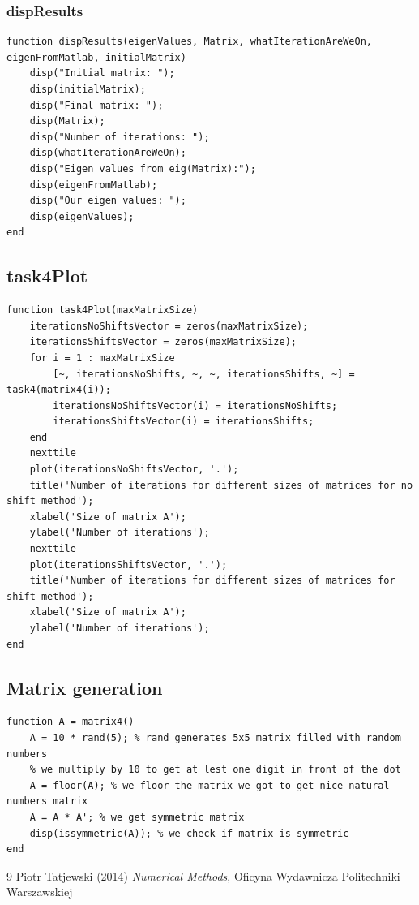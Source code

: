 \subsubsection{dispResults}
\begin{simplechar}
\begin{lstlisting}
function dispResults(eigenValues, Matrix, whatIterationAreWeOn, eigenFromMatlab, initialMatrix)
    disp("Initial matrix: ");
    disp(initialMatrix);
    disp("Final matrix: ");
    disp(Matrix);
    disp("Number of iterations: ");
    disp(whatIterationAreWeOn);
    disp("Eigen values from eig(Matrix):");
    disp(eigenFromMatlab);
    disp("Our eigen values: ");
    disp(eigenValues);
end
\end{lstlisting}
\end{simplechar}

\newpage
\hypertarget{function4}{\subsection{task4Plot}}
\begin{simplechar}
\begin{lstlisting}
function task4Plot(maxMatrixSize)
    iterationsNoShiftsVector = zeros(maxMatrixSize);
    iterationsShiftsVector = zeros(maxMatrixSize);
    for i = 1 : maxMatrixSize
        [~, iterationsNoShifts, ~, ~, iterationsShifts, ~] = task4(matrix4(i));
        iterationsNoShiftsVector(i) = iterationsNoShifts;
        iterationsShiftsVector(i) = iterationsShifts;
    end
    nexttile
    plot(iterationsNoShiftsVector, '.');
    title('Number of iterations for different sizes of matrices for no shift method');
    xlabel('Size of matrix A');
    ylabel('Number of iterations');
    nexttile
    plot(iterationsShiftsVector, '.');
    title('Number of iterations for different sizes of matrices for shift method');
    xlabel('Size of matrix A');
    ylabel('Number of iterations');
end
\end{lstlisting}
\end{simplechar}

\hypertarget{function4_matrix_generation}{\subsection{Matrix generation}}
\begin{simplechar}
\begin{lstlisting}
function A = matrix4()
    A = 10 * rand(5); % rand generates 5x5 matrix filled with random numbers
    % we multiply by 10 to get at lest one digit in front of the dot
    A = floor(A); % we floor the matrix we got to get nice natural numbers matrix
    A = A * A'; % we get symmetric matrix
    disp(issymmetric(A)); % we check if matrix is symmetric
end
\end{lstlisting}
\end{simplechar}


\begin{thebibliography}{9}
Piotr Tatjewski (2014) \emph{Numerical Methods}, Oficyna Wydawnicza Politechniki Warszawskiej
\end{thebibliography}


